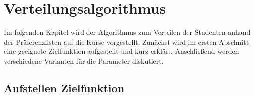 \chapter{Verteilungsalgorithmus}
\label{chapter:algorithm}
    Im folgenden Kapitel wird der Algorithmus zum Verteilen der Studenten anhand der Präferenzlisten auf die Kurse vorgestellt.
    Zunächst wird im ersten Abschnitt eine geeignete Zielfunktion aufgestellt und kurz erklärt.
    Anschließend werden verschiedene Varianten für die Parameter diskutiert.
    \section{Aufstellen Zielfunktion}
%            

